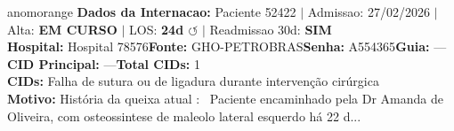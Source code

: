 \documentclass[a4paper,10pt]{article}
\begin{document}
\begin{anomalycard}[Internacao 167107 | GHO-PETROBRAS | ALTO (z=3.56)]{anomorange}
\textbf{Dados da Internacao:} Paciente 52422 $\mid$ Admissao: 27/02/2026 $\mid$ Alta: \textcolor{anomorange}{\textbf{EM CURSO}} $\mid$ LOS: \textbf{24d \textcolor{anomorange}{$\circlearrowleft$}} $\mid$ Readmissao 30d: \textcolor{anomred}{\textbf{SIM}}\\
\textbf{Hospital:} Hospital 78576\quad\textbf{Fonte:} GHO-PETROBRAS\quad\textbf{Senha:} A554365\quad\textbf{Guia:} ---\\
\textbf{CID Principal:} {\small ---}\quad\textbf{Total CIDs:} 1\\

\textbf{CIDs:} {\scriptsize Falha de sutura ou de ligadura durante intervenção cirúrgica}\\

\textbf{Motivo:} {\scriptsize História da queixa atual :  Paciente encaminhado pela Dr Amanda de Oliveira, com osteossintese de maleolo lateral esquerdo há 22 d...}\\


\end{anomalycard}
\end{document}

